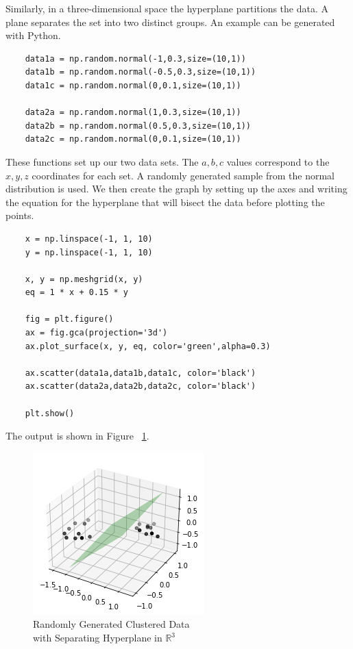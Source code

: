 \documentclass[12pt]{article}
\newcommand{\R}{\mathbb{R}}
\begin{document}
Similarly, in a three-dimensional space the hyperplane partitions the data. A plane separates the set into two distinct groups. An example can be generated with Python. 

\begin{verbatim}
    data1a = np.random.normal(-1,0.3,size=(10,1))
    data1b = np.random.normal(-0.5,0.3,size=(10,1))
    data1c = np.random.normal(0,0.1,size=(10,1))

    data2a = np.random.normal(1,0.3,size=(10,1))
    data2b = np.random.normal(0.5,0.3,size=(10,1))
    data2c = np.random.normal(0,0.1,size=(10,1))
\end{verbatim}

These functions set up our two data sets. The $a, b, c$ values correspond to the $x,y,z$ coordinates for each set. A randomly generated sample from the normal distribution is used. We then create the graph by setting up the axes and writing the equation for the hyperplane that will bisect the data before plotting the points.

\begin{verbatim}
    x = np.linspace(-1, 1, 10)
    y = np.linspace(-1, 1, 10)

    x, y = np.meshgrid(x, y)
    eq = 1 * x + 0.15 * y

    fig = plt.figure()
    ax = fig.gca(projection='3d')
    ax.plot_surface(x, y, eq, color='green',alpha=0.3)

    ax.scatter(data1a,data1b,data1c, color='black')
    ax.scatter(data2a,data2b,data2c, color='black')

    plt.show()
\end{verbatim}

The output is shown in Figure ~\ref{fig_randomly_generated_R3}.

\begin{figure}[H]
    \centering
    \includegraphics{Figures/randomly_generated_R3.png}
    \caption{Randomly Generated Clustered Data \\ with Separating Hyperplane in $\R^3$}
    \label{fig_randomly_generated_R3}
\end{figure}
\end{document}
